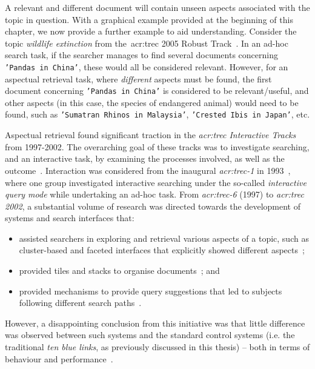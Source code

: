 A relevant and different document will contain unseen aspects associated with the topic in question. With a graphical example provided at the beginning of this chapter, we now provide a further example to aid understanding. Consider the topic \emph{wildlife extinction} from the~\gls{acr:trec} 2005 Robust Track~\citep{voorhees2006trec_robust}. In an ad-hoc search task, if the searcher manages to find several documents concerning \texttt{'Pandas in China'}, these would all be considered relevant. However, for an aspectual retrieval task, where \emph{different} aspects must be found, the first document concerning \texttt{'Pandas in China'} is considered to be relevant/useful, and other aspects (in this case, the species of endangered animal) would need to be found, such as \texttt{'Sumatran Rhinos in Malaysia'}, \texttt{'Crested Ibis in Japan'}, etc.

Aspectual retrieval found significant traction in the \emph{\gls{acr:trec} Interactive Tracks}~\citep{over2001trec} from 1997-2002. The overarching goal of these tracks was to investigate searching, and an interactive task, by examining the processes involved, as well as the outcome~\citep{over2001trec}. Interaction was considered from the inaugural \emph{\gls{acr:trec}-1} in 1993~\citep{harman1993trec1}, where one group investigated interactive searching under the so-called \emph{interactive query mode} while undertaking an ad-hoc task. From \emph{\gls{acr:trec}-6} (1997) to \emph{\gls{acr:trec} 2002}, a substantial volume of research was directed towards the development of systems and search interfaces that:

\begin{itemize}
    \item{assisted searchers in exploring and retrieval various aspects of a topic, such as cluster-based and faceted interfaces that explicitly showed different aspects~\citep{mcdonald1998interactive, villa2009aspect_interface};}
    \item{provided tiles and stacks to organise documents~\citep{hearst1995tilebars, hearst1997texttiling, harper2006piling, iwata2012tilediversified}; and}
    \item{provided mechanisms to provide query suggestions that led to subjects following different search paths~\citep{kato2012query_suggestion, umemoto2016scentbar}.}
\end{itemize}

However, a disappointing conclusion from this initiative was that little difference was observed between such systems and the standard control systems (i.e. the traditional \emph{ten blue links}, as previously discussed in this thesis) -- both in terms of behaviour and performance~\citep{voorhees2005trec_book}.

